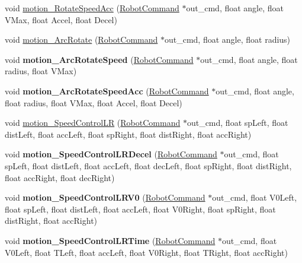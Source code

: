 \begin{DoxyCompactItemize}
\item 
void \hyperlink{classAsservInsa_ada416b12d072bc0a4bf6ecfebc0dcbc5}{motion\+\_\+\+Rotate\+Speed\+Acc} (\hyperlink{structRobotCommand}{Robot\+Command} $\ast$out\+\_\+cmd, float angle, float V\+Max, float Accel, float Decel)
\item 
void \hyperlink{classAsservInsa_ad243e9562a5191e34aed076e52e8fab8}{motion\+\_\+\+Arc\+Rotate} (\hyperlink{structRobotCommand}{Robot\+Command} $\ast$out\+\_\+cmd, float angle, float radius)
\item 
\mbox{\label{classAsservInsa_a592cd9219768e4cf06541589f106a6b5}} 
void {\bfseries motion\+\_\+\+Arc\+Rotate\+Speed} (\hyperlink{structRobotCommand}{Robot\+Command} $\ast$out\+\_\+cmd, float angle, float radius, float V\+Max)
\item 
\mbox{\label{classAsservInsa_ab151cfa4d4b3db98a4fb2a6c8bdccd3f}} 
void {\bfseries motion\+\_\+\+Arc\+Rotate\+Speed\+Acc} (\hyperlink{structRobotCommand}{Robot\+Command} $\ast$out\+\_\+cmd, float angle, float radius, float V\+Max, float Accel, float Decel)
\item 
void \hyperlink{classAsservInsa_ae70a0eb3fe9dab42d6fa1537ddcb6b8b}{motion\+\_\+\+Speed\+Control\+LR} (\hyperlink{structRobotCommand}{Robot\+Command} $\ast$out\+\_\+cmd, float sp\+Left, float dist\+Left, float acc\+Left, float sp\+Right, float dist\+Right, float acc\+Right)
\item 
\mbox{\label{classAsservInsa_a194081c0feee2875b046f2258beebe09}} 
void {\bfseries motion\+\_\+\+Speed\+Control\+L\+R\+Decel} (\hyperlink{structRobotCommand}{Robot\+Command} $\ast$out\+\_\+cmd, float sp\+Left, float dist\+Left, float acc\+Left, float dec\+Left, float sp\+Right, float dist\+Right, float acc\+Right, float dec\+Right)
\item 
\mbox{\label{classAsservInsa_a49676f6697d55466ab9c4219c1c1ac61}} 
void {\bfseries motion\+\_\+\+Speed\+Control\+L\+R\+V0} (\hyperlink{structRobotCommand}{Robot\+Command} $\ast$out\+\_\+cmd, float V0\+Left, float sp\+Left, float dist\+Left, float acc\+Left, float V0\+Right, float sp\+Right, float dist\+Right, float acc\+Right)
\item 
\mbox{\label{classAsservInsa_a6e82f45a33d07b91fbeba56a69b96c2d}} 
void {\bfseries motion\+\_\+\+Speed\+Control\+L\+R\+Time} (\hyperlink{structRobotCommand}{Robot\+Command} $\ast$out\+\_\+cmd, float V0\+Left, float T\+Left, float acc\+Left, float V0\+Right, float T\+Right, float acc\+Right)

\end{DoxyCompactItemize}
